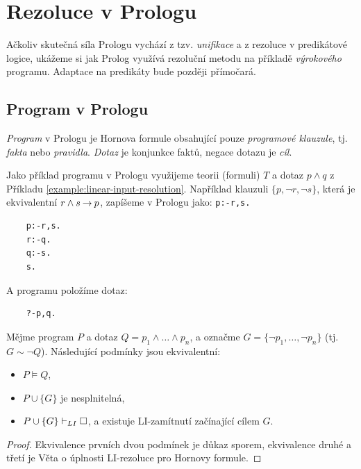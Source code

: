 \section{Rezoluce v Prologu}

Ačkoliv skutečná síla Prologu vychází z tzv. \emph{unifikace} a z rezoluce v predikátové logice, ukážeme si jak Prolog využívá rezoluční metodu na příkladě \emph{výrokového} programu. Adaptace na predikáty bude později přímočará.

\subsection{Program v Prologu}

\emph{Program} v Prologu je Hornova formule obsahující pouze \emph{programové klauzule}, tj. \emph{fakta} nebo \emph{pravidla}. \emph{Dotaz} je konjunkce faktů, negace dotazu je \emph{cíl}.

\begin{example}
Jako příklad programu v Prologu využijeme teorii (formuli) $T$ a dotaz $p\land q$ z Příkladu \ref{example:linear-input-resolution}. Například klauzuli $\{p,\neg r,\neg s\}$, která je ekvivalentní $r\land s\mathbin{\rightarrow} p$, zapíšeme v Prologu jako: \texttt{p:-r,s.}
\begin{verbatim}
    p:-r,s.
    r:-q.
    q:-s.
    s.    
\end{verbatim}
A programu položíme dotaz:
\begin{verbatim}
    ?-p,q.    
\end{verbatim}
\end{example}

\begin{corollary}
    Mějme program $P$ a dotaz $Q=p_1\land\dots\land p_n$, a označme $G=\{\neg p_1,\dots,\neg p_n\}$ (tj. $G\sim \neg Q$). Následující podmínky jsou ekvivalentní:
    \begin{itemize}
        \item $P\models Q$,
        \item $P\cup\{G\}$ je nesplnitelná,
        \item $P\cup\{G\}\vdash_{LI}\square$, a existuje LI-zamítnutí začínající cílem $G$.
    \end{itemize}
\end{corollary}
\begin{proof}
    Ekvivalence prvních dvou podmínek je důkaz sporem, ekvivalence druhé a třetí je Věta o úplnosti LI-rezoluce pro Hornovy formule.
\end{proof}

